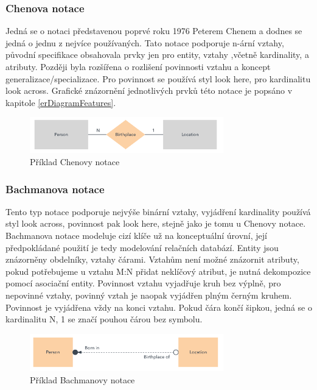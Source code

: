 \documentclass[czech,bachelor,public,dept460,male,oneside]{diploma}
\begin{document}
	\subsubsection{Chenova notace}
	Jedná se o notaci představenou poprvé roku 1976 Peterem Chenem a dodnes se jedná o jednu z nejvíce používaných. Tato notace podporuje n-ární vztahy, původní specifikace obsahovala prvky jen pro entity, vztahy ,včetně kardinality, a atributy. Později byla rozšířena o rozlišení povinnosti vztahu a koncept generalizace/specializace. Pro povinnost se používá styl look here, pro kardinalitu look across. Grafické znázornění jednotlivých prvků této notace je popsáno v kapitole \ref{erDiagramFeatures}.
	
	\begin{figure}[!h]
		\centering
		\includegraphics[width=0.75\textwidth]{Figures/NotationExChen}
		\caption[Příklad Chenovy notace]{Příklad Chenovy notace \cite{whatIsERD}}
	\end{figure}
	
	\subsubsection{Bachmanova notace}
	Tento typ notace podporuje nejvýše binární vztahy, vyjádření kardinality používá styl look across, povinnost pak look here, stejně jako je tomu u Chenovy notace. Bachmanova notace modeluje cizí klíče už na konceptuální úrovní, její předpokládané použití je tedy modelování relačních databází. Entity jsou znázorněny obdelníky, vztahy čárami. Vztahům není možné znázornit atributy, pokud potřebujeme u vztahu M:N přidat neklíčový atribut, je nutná dekompozice pomocí asociační entity. Povinnost vztahu vyjadřuje kruh bez výplně, pro nepovinné vztahy, povinný vztah je naopak vyjádřen plným černým kruhem. Povinnost je vyjádřena vždy na konci vztahu. Pokud čára končí šipkou, jedná se o kardinalitu N, 1 se značí pouhou čárou bez symbolu.
	
	\begin{figure}[!h]
		\centering
		\includegraphics[width=0.75\textwidth]{Figures/NotationExBachman}
		\caption[Příklad Bachmanovy notace]{Příklad Bachmanovy notace \cite{whatIsERD}}
	\end{figure}
	
\end{document}
